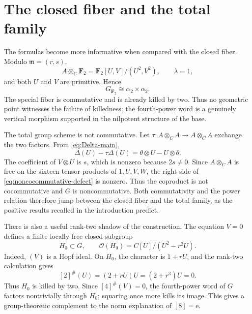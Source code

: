 \documentclass[11pt]{amsart}
\theoremstyle{definition}
\theoremstyle{remark}
\newcommand{\F}{\mathbf F}
\newcommand{\m}{\mathfrak m}
\newcommand{\ot}{\otimes}
\newcommand{\unit}{\mathrm e}
\begin{document}
\section{The closed fiber and the total family}\label{sec:geometry}

The formulas become more informative when compared with the closed fiber.
Modulo \(\m=(r,s)\),
\[
 A\ot_C\F_2=\F_2[U,V]/(U^2,V^2),
 \qquad \lambda=1,
\]
and both \(U\) and \(V\) are primitive.  Hence
\begin{equation}\label{eq:special-fiber}
 G_{\F_2}\cong\alpha _2\times\alpha _2.
\end{equation}
The special fiber is commutative and is already killed by two.  Thus no
geometric point witnesses the failure of killedness; the fourth-power word
is a genuinely vertical morphism supported in the nilpotent structure of
the base.

The total group scheme is not commutative.  Let
\(\tau\colon A\ot_C A\to A\ot_C A\) exchange the two factors.  From
\eqref{eq:Delta-main},
\begin{equation}\label{eq:noncocommutative-defect}
 \Delta(U)-\tau\Delta(U)
 =\theta\ot U-U\ot\theta.
\end{equation}
The coefficient of \(V\ot U\) is \(s\), which is nonzero because
\(2s\ne0\).  Since \(A\ot_C A\) is free on the sixteen tensor products of
\(1,U,V,W\), the right side of
\eqref{eq:noncocommutative-defect} is nonzero.  Thus the coproduct is not
cocommutative and \(G\) is noncommutative.  Both commutativity and the
power relation therefore jump between the closed fiber and the total
family, as the positive results recalled in the introduction predict.

There is also a useful rank-two shadow of the construction.  The equation
\(V=0\) defines a finite locally free closed subgroup
\begin{equation}\label{eq:H0}
 H_0\subset G,
 \qquad
 \mathcal O(H_0)=C[U]/(U^2-r^2U).
\end{equation}
Indeed, \((V)\) is a Hopf ideal.  On \(H_0\), the character is
\(1+rU\), and the rank-two calculation gives
\[
 [2]^\#(U)=(2+rU)U=(2+r^3)U=0.
\]
Thus \(H_0\) is killed by two.  Since \([4]^\#(V)=0\), the fourth-power
word of \(G\) factors nontrivially through \(H_0\); squaring once more
kills its image.  This gives a group-theoretic complement to the norm
explanation of \([8]=\unit\).
\end{document}
